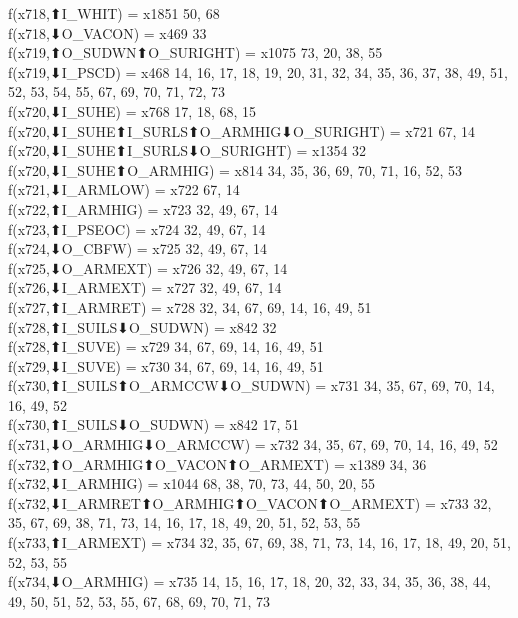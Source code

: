 f(x718,⬆I_WHIT) = x1851 {50, 68} \\
f(x718,⬇O_VACON) = x469 {33} \\
f(x719,⬆O_SUDWN⬆O_SURIGHT) = x1075 {73, 20, 38, 55} \\
f(x719,⬇I_PSCD) = x468 {14, 16, 17, 18, 19, 20, 31, 32, 34, 35, 36, 37, 38, 49, 51, 52, 53, 54, 55, 67, 69, 70, 71, 72, 73} \\
f(x720,⬇I_SUHE) = x768 {17, 18, 68, 15} \\
f(x720,⬇I_SUHE⬆I_SURLS⬆O_ARMHIG⬇O_SURIGHT) = x721 {67, 14} \\
f(x720,⬇I_SUHE⬆I_SURLS⬇O_SURIGHT) = x1354 {32} \\
f(x720,⬇I_SUHE⬆O_ARMHIG) = x814 {34, 35, 36, 69, 70, 71, 16, 52, 53} \\
f(x721,⬇I_ARMLOW) = x722 {67, 14} \\
f(x722,⬆I_ARMHIG) = x723 {32, 49, 67, 14} \\
f(x723,⬆I_PSEOC) = x724 {32, 49, 67, 14} \\
f(x724,⬇O_CBFW) = x725 {32, 49, 67, 14} \\
f(x725,⬇O_ARMEXT) = x726 {32, 49, 67, 14} \\
f(x726,⬇I_ARMEXT) = x727 {32, 49, 67, 14} \\
f(x727,⬆I_ARMRET) = x728 {32, 34, 67, 69, 14, 16, 49, 51} \\
f(x728,⬆I_SUILS⬇O_SUDWN) = x842 {32} \\
f(x728,⬆I_SUVE) = x729 {34, 67, 69, 14, 16, 49, 51} \\
f(x729,⬇I_SUVE) = x730 {34, 67, 69, 14, 16, 49, 51} \\
f(x730,⬆I_SUILS⬆O_ARMCCW⬇O_SUDWN) = x731 {34, 35, 67, 69, 70, 14, 16, 49, 52} \\
f(x730,⬆I_SUILS⬇O_SUDWN) = x842 {17, 51} \\
f(x731,⬇O_ARMHIG⬇O_ARMCCW) = x732 {34, 35, 67, 69, 70, 14, 16, 49, 52} \\
f(x732,⬆O_ARMHIG⬆O_VACON⬆O_ARMEXT) = x1389 {34, 36} \\
f(x732,⬇I_ARMHIG) = x1044 {68, 38, 70, 73, 44, 50, 20, 55} \\
f(x732,⬇I_ARMRET⬆O_ARMHIG⬆O_VACON⬆O_ARMEXT) = x733 {32, 35, 67, 69, 38, 71, 73, 14, 16, 17, 18, 49, 20, 51, 52, 53, 55} \\
f(x733,⬆I_ARMEXT) = x734 {32, 35, 67, 69, 38, 71, 73, 14, 16, 17, 18, 49, 20, 51, 52, 53, 55} \\
f(x734,⬇O_ARMHIG) = x735 {14, 15, 16, 17, 18, 20, 32, 33, 34, 35, 36, 38, 44, 49, 50, 51, 52, 53, 55, 67, 68, 69, 70, 71, 73} \\
